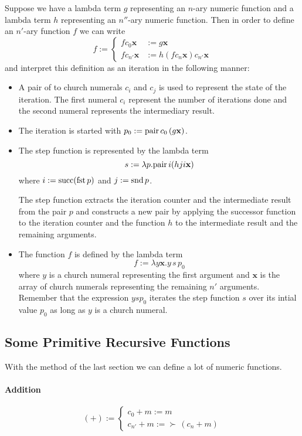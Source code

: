 Suppose we have a lambda term $g$ representing an $n$-ary numeric function and
a lambda term $h$ representing an $n''$-ary numeric function. Then in order to
define an $n'$-ary function $f$ we can write
$$
f :=
\begin{cases}
  f c_0 \mathbf{x} &:= g \mathbf{x}\\
  f c_{n'} \mathbf{x} &:= h (f c_n \mathbf{x}) c_{n'} \mathbf{x}
\end{cases}
$$
and interpret this definition as an iteration in the following manner:
\begin{itemize}
  \item
    A pair of to church numerals $c_i$ and $c_j$ is used to represent the
    state of the iteration. The first numeral $c_i$ represent the number of
    iterations done and the second numeral represents the intermediary result.

  \item
    The iteration is started with $p_0 := \text{pair}\, c_0 \, (g\mathbf{x})$.

  \item
    The step function is represented by the lambda term
    $$s := \lambda p. \text{pair}\, i (h j i \mathbf{x})$$
    where $i:= \text{succ} (\text{fst}\, p)$ and $j := \text{snd}\, p$.

    The step function extracts the iteration counter and the intermediate
    result from the pair $p$ and constructs a new pair by applying the
    successor function to the iteration counter and the function $h$ to the
    intermediate result and the remaining arguments.

  \item
    The function $f$ is defined by the lambda term
    $$ f := \lambda y \mathbf{x}. y \, s \, p_0$$
    where $y$ is a church numeral representing the first argument and
    $\mathbf{x}$ is the array of church numerals representing the remaining
    $n'$ arguments. Remember that the expression $y s p_0$ iterates the step
    function $s$ over its intial value $p_0$ as long as $y$ is a church numeral.
\end{itemize}


\subsection{Some Primitive Recursive Functions}

With the method of the last section we can define a lot of numeric functions.

\paragraph{Addition}
$$ (+) :=
\begin{cases}
  c_0 + m := m \\
  c_{n'} + m := \succ\, (c_n + m)
\end{cases}
$$

